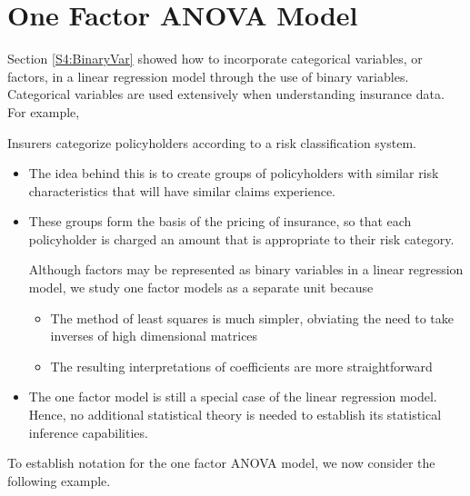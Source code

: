\section{One Factor ANOVA Model}

Section \ref{S4:BinaryVar} showed how to incorporate categorical
variables, or factors, in a linear regression model through the use
of binary variables. Categorical variables are used extensively when
understanding insurance data. For example,




    \item Insurers categorize policyholders according to a risk
    classification system.
      \begin{itemize}
    \item The idea behind this is to create groups of policyholders
    with similar risk characteristics that will have similar claims
    experience.
    \item These groups form the basis of the pricing of insurance,
    so that each policyholder is charged an amount that is
    appropriate to their risk category.


Although factors may be represented as binary variables in a linear
regression model, we study one factor models as a separate unit
because
    \begin{itemize}
    \item The method of least squares is much simpler, obviating the
    need to take inverses of high dimensional matrices
    \item The resulting interpretations of coefficients are more
    straightforward
         \end{itemize}
    \item The one factor model is still a special case of the linear
    regression model. Hence, no additional statistical theory is needed
    to establish its statistical inference capabilities.
     \end{itemize}



To establish notation for the one factor ANOVA model, we now
consider the following example.

\linejed

